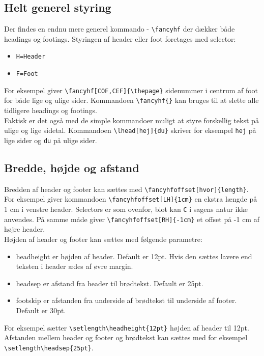 \documentclass{article}
\begin{document}
\subsection{Helt generel styring}
Der findes en endnu mere generel kommando - \verb"\fancyhf"  der dækker både headings og footings. Styringen af header eller foot foretages med selector: 
\begin{itemize}
\item \verb"H=Header" 
\item \verb"F=Foot"
\end{itemize}
For eksempel giver \verb"\fancyhf[COF,CEF]{\thepage}" sidenummer i centrum af foot for både lige og ulige sider. Kommandoen \verb"\fancyhf{}" kan bruges til at slette alle tidligere headings og footings. \\
Faktisk er det også med de simple kommandoer muligt at styre forskellig tekst på ulige og lige sidetal. Kommandoen \verb"\lhead[hej]{du}" skriver for eksempel \verb"hej" på lige sider og \verb"du" på ulige sider. 
\subsection{Bredde, højde og afstand}
Bredden af header og footer kan sættes med \verb"\fancyhfoffset[hvor]{length}". For eksempel giver kommandoen \verb"\fancyhfoffset[LH]{1cm}" en ekstra længde på 1 cm i venstre header. Selectors er som ovenfor, blot kan \verb"C" i sagens natur ikke anvendes. På samme måde giver \verb"\fancyhfoffset[RH]{-1cm}" et offset på -1 cm af højre header.\\
Højden af header og footer kan sættes med følgende parametre:
\begin{itemize}
\item headheight er højden af header. Default er 12pt. Hvis den sættes lavere end teksten i header ædes af øvre margin.
\item headsep er afstand fra header til brødtekst. Default er 25pt.
\item footskip er afstanden fra underside af brødtekst til underside af footer. Default er 30pt.
\end{itemize}
 For eksempel sætter \verb"\setlength\headheight{12pt}" højden af header til 12pt. Afstanden mellem header og footer og brødtekst kan sættes med for eksempel \verb"\setlength\headsep{25pt}".
\end{document}
